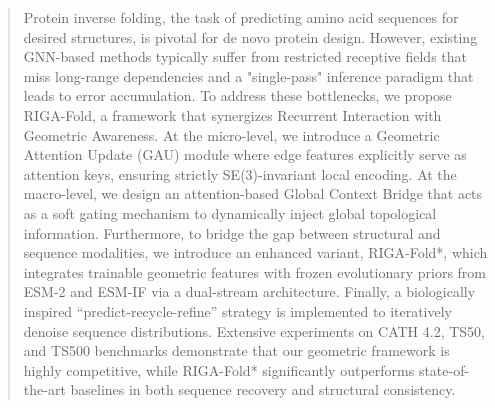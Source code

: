 \documentclass{article}
\theoremstyle{plain}
\theoremstyle{definition}
\theoremstyle{remark}
\begin{document}




\printAffiliationsAndNotice{}

\begin{abstract} 
Protein inverse folding, the task of predicting amino acid sequences for desired structures, is pivotal for de novo protein design. However, existing GNN-based methods typically suffer from restricted receptive fields that miss long-range dependencies and a "single-pass" inference paradigm that leads to error accumulation. To address these bottlenecks, we propose RIGA-Fold, a framework that synergizes Recurrent Interaction with Geometric Awareness. At the micro-level, we introduce a Geometric Attention Update (GAU) module where edge features explicitly serve as attention keys, ensuring strictly SE(3)-invariant local encoding. At the macro-level, we design an attention-based Global Context Bridge that acts as a soft gating mechanism to dynamically inject global topological information. Furthermore, to bridge the gap between structural and sequence modalities, we introduce an enhanced variant, RIGA-Fold*, which integrates trainable geometric features with frozen evolutionary priors from ESM-2 and ESM-IF via a dual-stream architecture. Finally, a biologically inspired ``predict-recycle-refine'' strategy is implemented to iteratively denoise sequence distributions. Extensive experiments on CATH 4.2, TS50, and TS500 benchmarks demonstrate that our geometric framework is highly competitive, while RIGA-Fold* significantly outperforms state-of-the-art baselines in both sequence recovery and structural consistency. 
\end{abstract}
\end{document}
